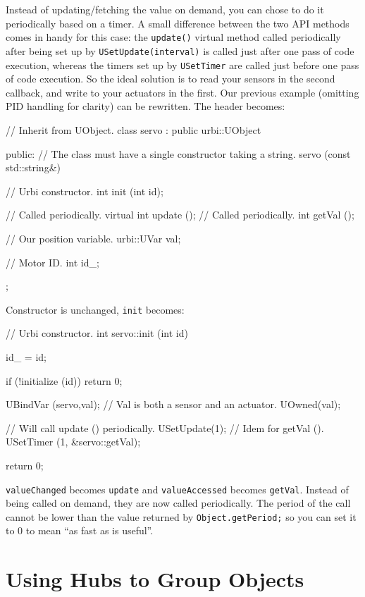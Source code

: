 Instead of updating/fetching the value on demand, you can chose to do
it periodically based on a timer. A small difference between the two
API methods comes in handy for this case: the \lstinline{update()}
virtual method called periodically after being set up by
\lstinline{USetUpdate(interval)} is called just after one pass of
\urbi code execution, whereas the timers set up by
\lstinline{USetTimer} are called just before one pass of \urbi code
execution. So the ideal solution is to read your sensors in the second
callback, and write to your actuators in the first. Our previous
example (omitting PID handling for clarity) can be rewritten. The
header becomes:

\begin{cxx}
// Inherit from UObject.
class servo : public urbi::UObject
{
public:
  // The class must have a single constructor taking a string.
  servo (const std::string&)

  // Urbi constructor.
  int init (int id);

  // Called periodically.
  virtual int update ();
  // Called periodically.
  int getVal ();

  // Our position variable.
  urbi::UVar val;

  // Motor ID.
  int id_;
};
\end{cxx}

Constructor is unchanged, \lstinline{init} becomes:

\begin{cxx}
// Urbi constructor.
int
servo::init (int id)
{
  id_ = id;

  if (!initialize (id))
    return 0;

  UBindVar (servo,val);
  // Val is both a sensor and an actuator.
  UOwned(val);

  // Will call update () periodically.
  USetUpdate(1);
  // Idem for getVal ().
  USetTimer (1, &servo::getVal);

  return 0;
}
\end{cxx}

\lstinline{valueChanged} becomes \lstinline{update} and
\lstinline{valueAccessed} becomes \lstinline{getVal}. Instead of being
called on demand, they are now called periodically. The period of the
call cannot be lower than the value returned by
\lstinline{Object.getPeriod;}
so you can set it to 0 to mean ``as fast as is useful''.

\section{Using Hubs to Group Objects}

